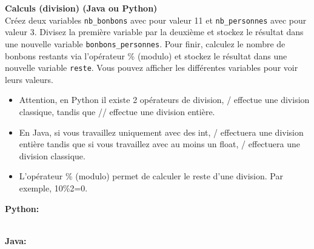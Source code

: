  \begin{Exercice}[10 minutes] \textbf{Calculs (division) (Java ou Python)}\\
     Créez deux variables \texttt{nb\_bonbons} avec pour valeur 11 et \texttt{nb\_personnes} avec pour valeur 3. Divisez la première variable par la deuxième et stockez le résultat dans une nouvelle variable \texttt{bonbons\_personnes}. Pour finir, calculez le nombre de bonbons restants via l'opérateur \% (modulo) et stockez le résultat dans une nouvelle variable \texttt{reste}. Vous pouvez afficher les différentes variables pour voir leurs valeurs. \\
     
      \begin{conseil}
         \begin{itemize}
            \item Attention, en Python il existe 2 opérateurs de division, / effectue une division classique, tandis que // effectue une division entière.
            \item En Java, si vous travaillez uniquement avec des int, / effectuera une division entière tandis que si vous travaillez avec au moins un float, / effectuera une division classique.
            \item L'opérateur \% (modulo) permet de calculer le reste d'une division. Par exemple, 10\%2=0.
         \end{itemize}
      \end{conseil}
      \begin{solution}
      
      \textbf{Python:}
      
      
      
      \textbf{\\Java:}
      
             
      \end{solution}   
  \end{Exercice}
  
